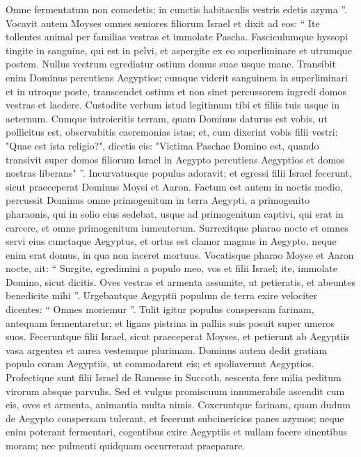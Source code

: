 \begin{biblechapter}
\begin{biblechapter}
\begin{biblechapter}
\begin{biblechapter}
\begin{biblechapter}
\begin{biblechapter}
\begin{biblechapter}
\begin{biblechapter}
\begin{biblechapter}
\begin{biblechapter}
\begin{biblechapter}
\begin{biblechapter}
\verse Omne fermentatum non comedetis; in cunctis habitaculis vestris edetis azyma ”.
 \verse Vocavit autem Moyses omnes seniores filiorum Israel et dixit ad eos: “ Ite tollentes animal per familias vestras et immolate Pascha. 
\verse Fasciculumque hyssopi tingite in sanguine, qui est in pelvi, et aspergite ex eo superliminare et utrumque postem. Nullus vestrum egrediatur ostium domus suae usque mane. 
 \verse Transibit enim Dominus percutiens Aegyptios; cumque viderit sanguinem in superliminari et in utroque poste, transcendet ostium et non sinet percussorem ingredi domos vestras et laedere. 
\verse Custodite verbum istud legitimum tibi et filiis tuis usque in aeternum. 
\verse Cumque introieritis terram, quam Dominus daturus est vobis, ut pollicitus est, observabitis caeremonias istas; 
 \verse et, cum dixerint vobis filii vestri: "Quae est ista religio?", 
\verse dicetis eis: "Victima Paschae Domino est, quando transivit super domos filiorum Israel in Aegypto percutiens Aegyptios et domos nostras liberans" ”. Incurvatusque populus adoravit; 
\verse et egressi filii Israel fecerunt, sicut praeceperat Dominus Moysi et Aaron.
 \verse Factum est autem in noctis medio, percussit Dominus omne primogenitum in terra Aegypti, a primogenito pharaonis, qui in solio eius sedebat, usque ad primogenitum captivi, qui erat in carcere, et omne primogenitum iumentorum. 
 \verse Surrexitque pharao nocte et omnes servi eius cunctaque Aegyptus, et ortus est clamor magnus in Aegypto, neque enim erat domus, in qua non iaceret mortuus. 
 \verse Vocatisque pharao Moyse et Aaron nocte, ait: “ Surgite, egredimini a populo meo, vos et filii Israel; ite, immolate Domino, sicut dicitis. 
\verse Oves vestras et armenta assumite, ut petieratis, et abeuntes benedicite mihi ”. 
 \verse Urgebantque Aegyptii populum de terra exire velociter dicentes: “ Omnes moriemur ”. 
\verse Tulit igitur populus conspersam farinam, antequam fermentaretur; et ligans pistrina in palliis suis posuit super umeros suos. 
 \verse Feceruntque filii Israel, sicut praeceperat Moyses, et petierunt ab Aegyptiis vasa argentea et aurea vestemque plurimam. 
\verse Dominus autem dedit gratiam populo coram Aegyptiis, ut commodarent eis; et spoliaverunt Aegyptios.
 \verse Profectique sunt filii Israel de Ramesse in Succoth, sescenta fere milia peditum virorum absque parvulis. 
\verse Sed et vulgus promiscuum innumerabile ascendit cum eis, oves et armenta, animantia multa nimis. 
\verse Coxeruntque farinam, quam dudum de Aegypto conspersam tulerant, et fecerunt subcinericios panes azymos; neque enim poterant fermentari, cogentibus exire Aegyptiis et nullam facere sinentibus moram; nec pulmenti quidquam occurrerant praeparare.

\end{biblechapter}
\end{biblechapter}
\end{biblechapter}
\end{biblechapter}
\end{biblechapter}
\end{biblechapter}
\end{biblechapter}
\end{biblechapter}
\end{biblechapter}
\end{biblechapter}
\end{biblechapter}
\end{biblechapter}
